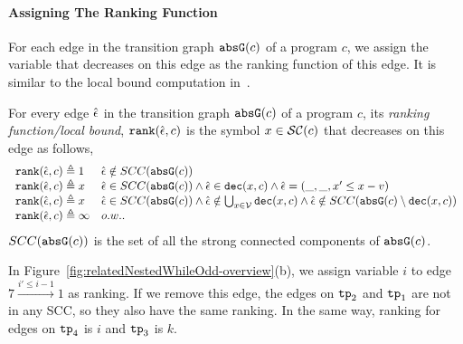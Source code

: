   \paragraph{Assigning The Ranking Function}
  For each edge in the transition graph $\mathtt{abs}{\mathtt{G}}(c)$ of a program $c$,
  we assign the variable that decreases on this edge as the ranking function of this edge.
  It is similar to the local bound computation in~\cite{SinnZV17}.
  \begin{defn}
  \label{def:ranking_gen}
  For every edge $\hat{\mathtt{\epsilon}{}}$ in the transition graph $\mathtt{abs}{\mathtt{G}}(c)$ of a program $c$,
  its \emph{ranking function/local bound}, $\mathtt{rank}(\hat{\mathtt{\epsilon}{}}, c)$
  is the symbol $x\in \mathcal{SC}(c)$ that decreases on this edge as follows,
{\small
\[ 
\begin{array}{ll}
  \mathtt{rank}(\hat{\mathtt{\epsilon}{}}, c) \triangleq 1 
  & \hat{\mathtt{\epsilon}{}} \notin SCC(\mathtt{abs}{\mathtt{G}}(c))
  \\
  \mathtt{rank}(\hat{\mathtt{\epsilon}{}}, c) \triangleq x
  & \hat{\mathtt{\epsilon}{}} \in SCC(\mathtt{abs}{\mathtt{G}}(c)) \land \hat{\mathtt{\epsilon}{}} \in \mathtt{dec}(x, c) \land  \hat{\mathtt{\epsilon}{}} = (\_, \_ , x' \leq x - v) \\
  \mathtt{rank}(\hat{\mathtt{\epsilon}{}}, c) \triangleq x
  & \hat{\mathtt{\epsilon}{}} \in SCC(\mathtt{abs}{\mathtt{G}}(c)) \land 
  \hat{\mathtt{\epsilon}{}}  \notin \bigcup_{x \in \mathcal{V}} \mathtt{dec}(x, c)
  \land \hat{\mathtt{\epsilon}{}} \notin SCC(\mathtt{abs}{\mathtt{G}}(c) \setminus \mathtt{dec}(x, c))\\
  \mathtt{rank}(\hat{\mathtt{\epsilon}{}}, c) \triangleq \infty
  & o.w..
\end{array}
\]
}
$SCC(\mathtt{abs}{\mathtt{G}}(c))$ is the set of all the strong connected components of $\mathtt{abs}{\mathtt{G}}(c)$.
  \end{defn}
  In Figure~\ref{fig:relatedNestedWhileOdd-overview}(b), we assign variable $i$ to edge $7 \xrightarrow{i' \leq i - 1} 1$ as ranking.
  If we remove this edge, the edges on $\mathtt{tp}_2$ and $\mathtt{tp}_1$ are not in any SCC, so they also have the same ranking.
In the same way, ranking for edges on $\mathtt{tp}_4$ is $i$ and $\mathtt{tp}_3$ is $k$.
